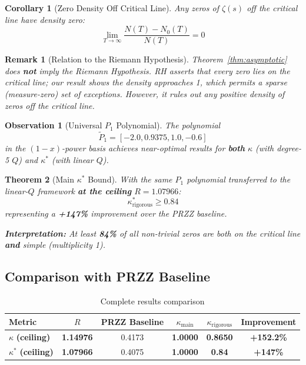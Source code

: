 \documentclass[11pt]{article}
\newtheorem{theorem}{Theorem}
\newtheorem{corollary}{Corollary}
\newtheorem{remark}{Remark}
\newtheorem{observation}[theorem]{Observation}
\begin{document}
\begin{corollary}[Zero Density Off Critical Line]
\label{cor:zero-density}
Any zeros of $\zeta(s)$ off the critical line have density zero:
\[
\lim_{T \to \infty} \frac{N(T) - N_0(T)}{N(T)} = 0
\]
\end{corollary}

\begin{remark}[Relation to the Riemann Hypothesis]
\label{rem:not-rh}
Theorem~\ref{thm:asymptotic} does \textbf{not} imply the Riemann Hypothesis.
RH asserts that \emph{every} zero lies on the critical line; our result shows
the \emph{density} approaches 1, which permits a sparse (measure-zero) set of
exceptions. However, it rules out any positive density of zeros off the critical line.
\end{remark}

\begin{observation}[Universal $P_1$ Polynomial]
\label{obs:universal-P1}
The polynomial
\begin{equation}
\tilde{P}_1 = [-2.0, 0.9375, 1.0, -0.6]
\end{equation}
in the $(1-x)$-power basis achieves near-optimal results for \textbf{both} $\kappa$ (with degree-5 $Q$) and $\kappa^*$ (with linear $Q$).
\end{observation}

\begin{theorem}[Main $\kappa^*$ Bound]
With the same $P_1$ polynomial transferred to the linear-$Q$ framework \textbf{at the ceiling} $R = 1.07966$:
\begin{equation}
\boxed{\kappa^*_{\text{rigorous}} \geq 0.84}
\end{equation}
representing a \textcolor{improvement}{\textbf{+147\%}} improvement over the PRZZ baseline.

\textbf{Interpretation:} At least \textbf{84\%} of all non-trivial zeros are both on the critical line \textbf{and} simple (multiplicity 1).
\end{theorem}

\subsection{Comparison with PRZZ Baseline}

\begin{table}[h]
\centering
\caption{Complete results comparison}
\begin{tabular}{lccccc}
\toprule
Metric & $R$ & PRZZ Baseline & $\kappa_{\text{main}}$ & $\kappa_{\text{rigorous}}$ & Improvement \\
\midrule
\rowcolor{yellow!30} $\kappa$ \textbf{(ceiling)} & \textbf{1.14976} & 0.4173 & \textbf{1.0000} & \textbf{0.8650} & \textcolor{improvement}{\textbf{+152.2\%}} \\
\rowcolor{yellow!30} $\kappa^*$ \textbf{(ceiling)} & \textbf{1.07966} & 0.4075 & \textbf{1.0000} & \textbf{0.84} & \textcolor{improvement}{\textbf{+147\%}} \\
\bottomrule
\end{tabular}
\end{table}
\end{document}
